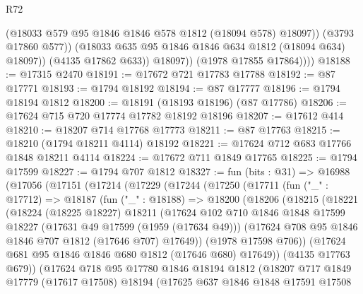 \begin{lexlean}{R72}
\begin{coremodule}
                      (@18033 @579 @95 @1846 @1846 @578 @1812 (@18094 @578) @18097))
                    (@3793 @17860 @577))
                  (@18033 @635 @95 @1846 @1846 @634 @1812 (@18094 @634) @18097))
                (@4135 @17862 @633))
              @18097))
          (@1978 @17855 @17864))))
@18188 := @17315 @2470
@18191 := @17672 @721 @17783 @17788
@18192 := @87 @17771
@18193 := @1794 @18192
@18194 := @87 @17777
@18196 := @1794 @18194 @1812
@18200 := @18191 (@18193 @18196) (@87 @17786)
@18206 := @17624 @715 @720 @17774 @17782 @18192 @18196
@18207 := @17612 @414
@18210 := @18207 @714 @17768 @17773
@18211 := @87 @17763
@18215 := @18210 (@1794 @18211 @4114) @18192
@18221 := @17624 @712 @683 @17766 @1848 @18211 @4114
@18224 := @17672 @711 @1849 @17765
@18225 := @1794 @17599
@18227 := @1794 @707 @1812
@18327 := fun (bits : @31) =>
  @16988
    (@17056
      (@17151
        (@17214
          (@17229
            (@17244
              (@17250
                (@17711
                  (fun ("_" : @17712) =>
                  @18187
                    (fun ("_" : @18188) =>
                    @18200
                      (@18206
                        (@18215
                          (@18221
                            (@18224
                              (@18225 @18227)
                              @18211
                              (@17624
                                @102
                                @710
                                @1846
                                @1848
                                @17599
                                @18227
                                (@17631 @49 @17599 (@1959 (@17634 @49)))
                                (@17624 @708 @95 @1846 @1846 @707 @1812 (@17646 @707) @17649))
                              (@1978 @17598 @706))
                            (@17624 @681 @95 @1846 @1846 @680 @1812 (@17646 @680) @17649))
                          (@4135 @17763 @679))
                        (@17624
                          @718
                          @95
                          @17780
                          @1846
                          @18194
                          @1812
                          (@18207
                            @717
                            @1849
                            @17779
                            (@17617 @17508)
                            @18194
                            (@17625
                              @637
                              @1846
                              @1848
                              @17591
                              @17508

\end{coremodule}
\end{lexlean}
